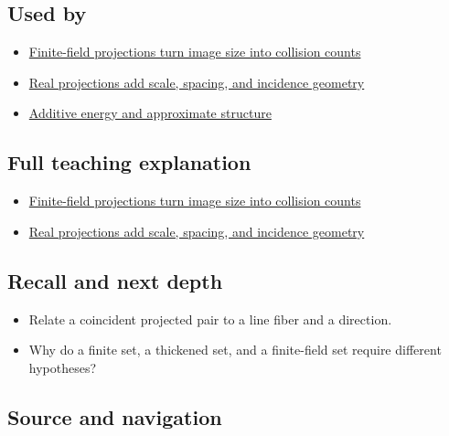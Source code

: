 \subsection{Used by}\label{appendix-3c73f7862157-used-by}

\begin{itemize}
\tightlist
\item
  \hyperref[04-visual-computing-ii-ch032-finite-field-projections-turn-image-size-into-collision-counts]{Finite-field projections turn image size into collision counts}
\item
  \hyperref[04-visual-computing-ii-ch033-real-projections-add-scale-spacing-and-incidence-geometry]{Real projections add scale, spacing, and incidence geometry}
\item
  \hyperref[appendix-b0732b22e7d6]{Additive energy and approximate structure}
\end{itemize}

\subsection{Full teaching explanation}\label{appendix-3c73f7862157-full-teaching-explanation}

\begin{itemize}
\tightlist
\item
  \hyperref[04-visual-computing-ii-ch032-finite-field-projections-turn-image-size-into-collision-counts]{Finite-field projections turn image size into collision counts}
\item
  \hyperref[04-visual-computing-ii-ch033-real-projections-add-scale-spacing-and-incidence-geometry]{Real projections add scale, spacing, and incidence geometry}
\end{itemize}

\subsection{Recall and next depth}\label{appendix-3c73f7862157-recall-and-next-depth}

\begin{itemize}
\tightlist
\item
  Relate a coincident projected pair to a line fiber and a direction.
\item
  Why do a finite set, a thickened set, and a finite-field set require different hypotheses?
\end{itemize}

\subsection{Source and navigation}\label{appendix-3c73f7862157-source-and-navigation}

